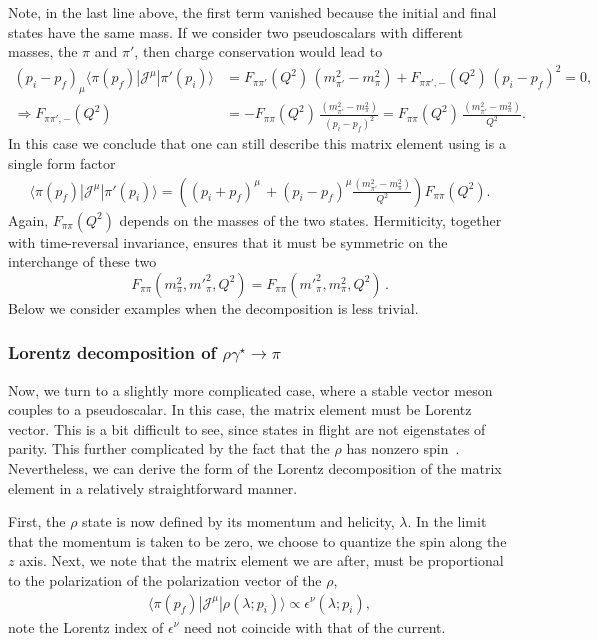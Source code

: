 Note, in the last line above, the first term vanished because the initial and final states have the same mass. If we consider two pseudoscalars with different masses, the $\pi$ and $\pi'$, then charge conservation would lead to
\begin{align}
(p_i-p_f)_\mu\langle\pi(p_f)|{\mathcal{J}}^{\mu}|\pi'(p_i)\rangle&=
F_{\pi\pi'}(Q^2)\, (m_{\pi'}^2-m_\pi^2)
+
F_{\pi\pi',-}(Q^2)\,(p_i-p_f)^2
=0,
\\
\Rightarrow
F_{\pi\pi',-}(Q^2)
&=-
F_{\pi\pi}(Q^2)\, \frac{(m_{\pi'}^2-m_\pi^2)}{(p_i-p_f)^2}
= 
F_{\pi\pi}(Q^2)\, \frac{(m_{\pi'}^2-m_\pi^2)}{Q^2}.
\end{align} 
In this case we conclude that one can still describe this matrix element using is a single form factor
\begin{align}
\langle\pi(p_f)|{\mathcal{J}}^{\mu}|\pi'(p_i)\rangle=
\left( (p_i+p_f)^\mu \, +(p_i-p_f)^\mu\frac{(m_{\pi'}^2-m_\pi^2)}{Q^2}\right)F_{\pi\pi}(Q^2).
\label{eq:pi_to_pi_FF}
\end{align}
Again, $F_{\pi\pi}(Q^2)$ depends on the masses of the two states. {\mh  Hermiticity, together with time-reversal invariance, ensures that it must be symmetric on the interchange of these two
\begin{equation}
F_{\pi\pi}(m^2_\pi, m'^2 _\pi,Q^2) = F_{\pi\pi}(m'^2_\pi, m^2 _\pi,Q^2) \,.
\end{equation}}
Below we consider examples when the decomposition is less trivial.  



\subsubsection{Lorentz decomposition of $\rho\gamma^\star\to\pi$}

Now, we turn to a slightly more complicated case, where a stable vector meson couples to a pseudoscalar.  In this case, the matrix element must be Lorentz vector. This is a bit difficult to see, since states in flight are not eigenstates of parity. This further complicated by the fact that the $\rho$ has nonzero spin~\cite{Thomas:2011rh}. Nevertheless, we can derive the form of the Lorentz decomposition of the matrix element in a relatively straightforward manner.

First, the $\rho$ state is now defined by its momentum and helicity, $\lambda$. In the limit that the momentum is taken to be zero, we choose to quantize the spin along the $z$ axis.  Next, we note that the matrix element we are after, must be proportional to the polarization of the polarization vector of the $\rho$,
\begin{align}
\langle \pi(p_f)|\mathcal{J}^\mu|\rho(\lambda; p_i)\rangle\propto \epsilon^\nu(\lambda; p_i),
\end{align}
note the Lorentz index of $\epsilon^\nu$ need not coincide with that of the current. 

